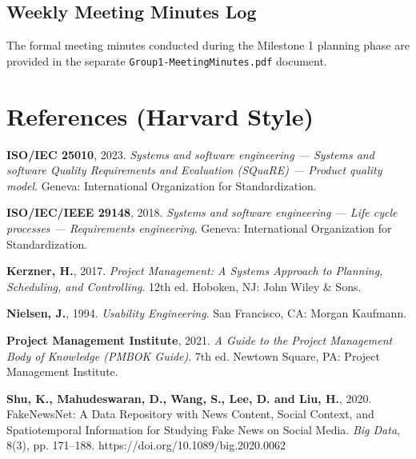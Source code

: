 \documentclass[11pt, a4paper]{article}
\begin{document}
\subsection{Weekly Meeting Minutes Log}
The formal meeting minutes conducted during the Milestone 1 planning phase are provided in the separate \texttt{Group1-MeetingMinutes.pdf} document.

\section{References (Harvard Style)}
\label{sec:references}

\begin{enumerate}[label={[\arabic*]}, leftmargin=2.5em]
  \item \label{ref:iso25010} \textbf{ISO/IEC 25010}, 2023. \emph{Systems and software engineering --- Systems and software Quality Requirements and Evaluation (SQuaRE) --- Product quality model}. Geneva: International Organization for Standardization.

  \item \label{ref:iso29148} \textbf{ISO/IEC/IEEE 29148}, 2018. \emph{Systems and software engineering --- Life cycle processes --- Requirements engineering}. Geneva: International Organization for Standardization.

  \item \label{ref:kerzner} \textbf{Kerzner, H.}, 2017. \emph{Project Management: A Systems Approach to Planning, Scheduling, and Controlling}. 12th ed. Hoboken, NJ: John Wiley \& Sons.

  \item \label{ref:nielsen} \textbf{Nielsen, J.}, 1994. \emph{Usability Engineering}. San Francisco, CA: Morgan Kaufmann.

  \item \label{ref:pmbok} \textbf{Project Management Institute}, 2021. \emph{A Guide to the Project Management Body of Knowledge (PMBOK Guide)}. 7th ed. Newtown Square, PA: Project Management Institute.

  \item \label{ref:shu} \textbf{Shu, K., Mahudeswaran, D., Wang, S., Lee, D. and Liu, H.}, 2020. FakeNewsNet: A Data Repository with News Content, Social Context, and Spatiotemporal Information for Studying Fake News on Social Media. \emph{Big Data}, 8(3), pp. 171--188. https://doi.org/10.1089/big.2020.0062


\end{enumerate}
\end{document}
